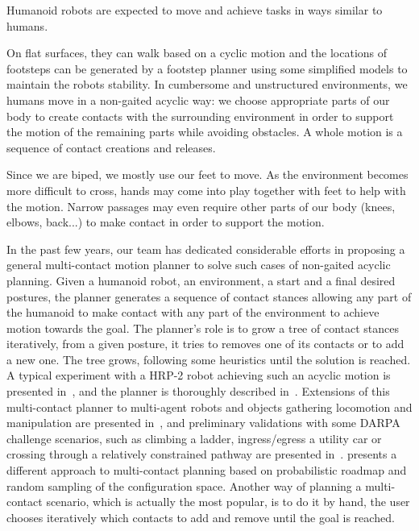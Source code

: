 Humanoid robots are expected to move and achieve tasks in ways similar to humans.

On flat surfaces, they can walk based on a cyclic motion and the locations of footsteps can be generated by a footstep planner using some simplified models to maintain the robots stability.
In cumbersome and unstructured environments, we humans move in a non-gaited acyclic way: we choose appropriate parts of our body to create contacts with the surrounding environment in order to support the motion of the remaining parts while avoiding obstacles.
A whole motion is a sequence of contact creations and releases.

Since we are biped, we mostly use our feet to move.
As the environment becomes more difficult to cross, hands may come into play together with feet to help with the motion.
Narrow passages may even require other parts of our body (knees, elbows, back...) to make contact in order to support the motion.

In the past few years, our team has dedicated considerable efforts in proposing a general multi-contact motion planner to solve such cases of non-gaited acyclic planning.
Given a humanoid robot, an environment, a start and a final desired postures, the planner generates a sequence of contact stances allowing any part of the humanoid to make contact with any part of the environment to achieve motion towards the goal.
The planner's role is to grow a tree of contact stances iteratively, from a given posture, it tries to removes one of its contacts or to add a new one.
The tree grows, following some heuristics until the solution is reached.
A typical experiment with a HRP-2 robot achieving such an acyclic motion is presented in~\cite{escande:iser:2008}, and the planner is thoroughly described in~\cite{escande:ras:2013}.
Extensions of this multi-contact planner to multi-agent robots and objects gathering locomotion and manipulation are presented in~\cite{bouyarmane:ar:2012}, and preliminary validations with some DARPA challenge scenarios, such as climbing a ladder, ingress/egress a utility car or crossing through a relatively constrained pathway are presented in~\cite{bouyarmane:humanoids:2012}.
\cite{hauser:issr:2007} presents a different approach to multi-contact planning based on probabilistic roadmap and random sampling of the configuration space.
Another way of planning a multi-contact scenario, which is actually the most popular, is to do it by hand, the user chooses iteratively which contacts to add and remove until the goal is reached.

